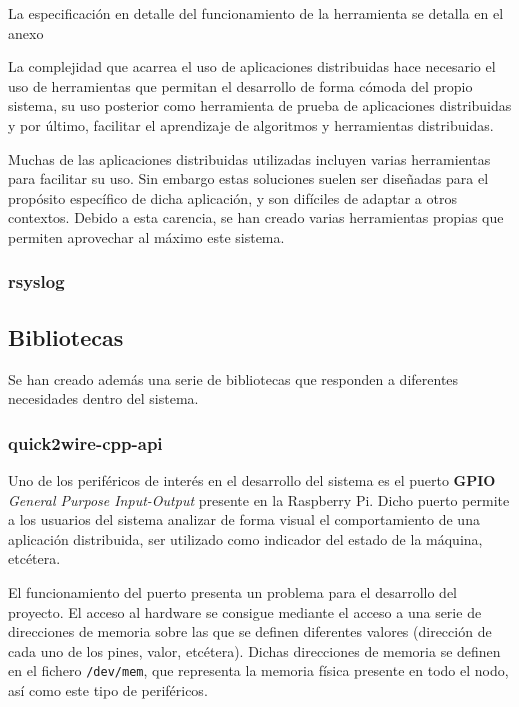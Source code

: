 La especificación en detalle del funcionamiento de la herramienta se detalla en el anexo%






La complejidad que acarrea el uso de aplicaciones distribuidas hace necesario el uso de herramientas que permitan el desarrollo de forma cómoda del propio sistema, su uso posterior como herramienta de prueba de aplicaciones distribuidas y por último, facilitar el aprendizaje de algoritmos y herramientas distribuidas.

Muchas de las aplicaciones distribuidas utilizadas incluyen varias herramientas para facilitar su uso. Sin embargo estas soluciones suelen ser diseñadas para el propósito específico de dicha aplicación, y son difíciles de adaptar a otros contextos. Debido a esta carencia, se han creado varias herramientas propias que permiten aprovechar al máximo este sistema.


\subsubsection{rsyslog}

\subsection{Bibliotecas}

Se han creado además una serie de bibliotecas que responden a diferentes necesidades dentro del sistema.

\subsubsection{quick2wire-cpp-api}

Uno de los periféricos de interés en el desarrollo del sistema es el puerto \textbf{GPIO} \textit{General Purpose Input-Output} presente en la Raspberry Pi. Dicho puerto permite a los usuarios del sistema analizar de forma visual el comportamiento de una aplicación distribuida, ser utilizado como indicador del estado de la máquina, etcétera.

El funcionamiento del puerto presenta un problema para el desarrollo del proyecto. El acceso al hardware se consigue mediante el acceso a una serie de direcciones de memoria sobre las que se definen diferentes valores (dirección de cada uno de los pines, valor, etcétera). Dichas direcciones de memoria se definen en el fichero \texttt{/dev/mem}, que representa la memoria física presente en todo el nodo, así como este tipo de periféricos.

